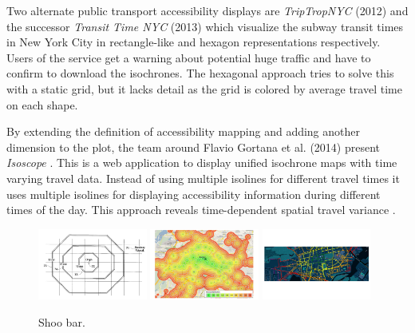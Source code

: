     Two alternate public transport accessibility displays are
    \textit{TripTropNYC} (2012) \cite{TriptropNYC} and the successor
    \textit{Transit Time NYC} (2013) \cite{TransitTimeNYC} which visualize the
    subway transit times in New York City in rectangle-like and hexagon
    representations respectively. Users of the service get a warning about
    potential huge traffic and have to confirm to download the isochrones. The
    hexagonal approach tries to solve this with a static grid, but it lacks
    detail as the grid is colored by average travel time on each shape.\par

    By extending the definition of accessibility mapping and adding another
    dimension to the plot, the team around Flavio Gortana et al. (2014) present
    \textit{Isoscope} \cite{Isoscope}. This is a web application to display
    unified isochrone maps with time varying travel data. Instead of using
    multiple isolines for different travel times it uses multiple isolines for
    displaying accessibility information during different times of the day.
    This approach reveals time-dependent spatial travel variance
    \cite{gortanaisoscope}.\par

    \begin{figure}[t]
      {\includegraphics[width=0.32\textwidth]{./img/overv-patnt.png}}
      \hfill
      {\includegraphics[width=0.32\textwidth]{./img/overv-berln.png}}
      \hfill
      {\includegraphics[width=0.32\textwidth]{./img/overv-potsd.png}}
      \caption{Shoo bar.}
      \label{fig:overv:5}
    \end{figure}

